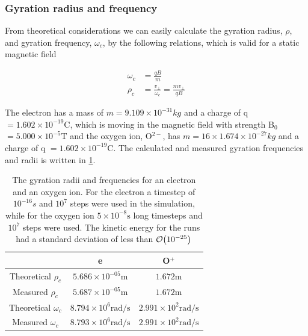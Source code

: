 \documentclass[x11names]{article}
\begin{document}
      \subsubsection{Gyration radius and frequency}
            From theoretical considerations we can easily calculate the gyration radius, \(\rho\), and gyration frequency, \( \omega_c \), by the following relations, which is valid for a static magnetic field

            \begin{align}
                  \omega_c    &= \frac{qB}{m} \\
                  \rho_c      &= \frac{v_\perp}{\omega_c} = \frac{mv_\perp}{qB}
            \end{align}

            The electron has a mass of \(m = 9.109 \times 10^{-31} \si{kg}\) and a charge of q \( = 1.602\times 10^{-19} \si{\coulomb} \), which is moving in the magnetic field with strength B\(_0\) \( = 5.000 \times 10^ {-5} \si{\tesla}\) and the oxygen ion,  O\(^{2-}\), has \(m = 16 \times 1.674 \times 10^{-27} \si{kg}\) and a charge of q \( = 1.602\times 10^{-19} \si{\coulomb} \). The calculated and measured gyration frequencies and radii is written in \cref{tab:results}.




            \begin{table}
                  \centering
                  \begin{tabular}{| c |c | c |}
                        \hline
                                                & e   & O$^+$
                        \\ \hline
                        Theoretical $\rho_c$    &  $5.686 \times 10^{-05} \si{\meter}$   &    $1.672  \si{\meter}$ 
                        \\ \hline
                        Measured $\rho_c$       &  $5.687 \times 10^{-05} \si{\meter}$  &     $1.672 \si{\meter}$ 
                        \\ \hline
                        Theoretical \(\omega_c\)&  $8.794 \times 10^{6} \si{ \radian\per\second} $  & $ 2.991 \times 10 ^{2}\si{ \radian\per\second} $
                        \\ \hline
                        Measured \(\omega_c\)   &  $ 8.793\times 10^{6} \si{ \radian\per\second}$  &  $ 2.991 \times 10 ^{2} \si{ \radian\per\second}$
                        \\ \hline
                  \end{tabular}
                  \caption{The gyration radii and frequencies for an electron and an oxygen ion. For the electron a timestep of \( 10^{-16} \si{s} \) and \(10^7\) steps were used in the simulation, while for the oxygen ion \( 5\times 10^{-8} \si{\second } \) long timesteps and \(10^7\) steps were used. The kinetic energy for the runs had a standard deviation of less than \(\order{10^{-25}}\)}
                  \label{tab:results}
            \end{table}
\end{document}
